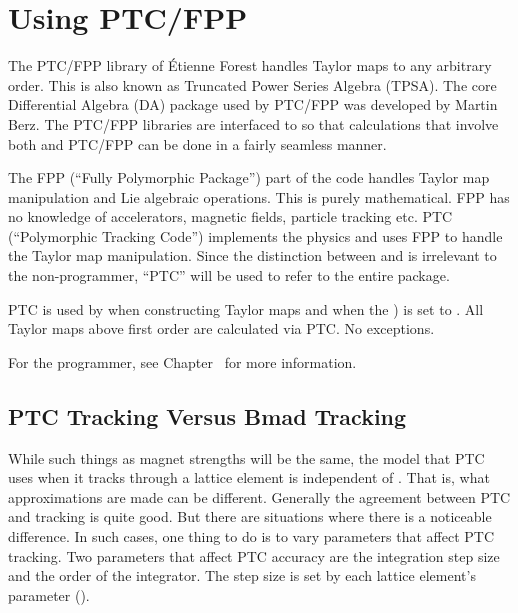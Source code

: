 \chapter{Using PTC/FPP}
\label{c:ptc.use}


The PTC/FPP library of \'Etienne Forest handles Taylor maps to any arbitrary order. This is also
known as Truncated Power Series Algebra (TPSA). The core Differential Algebra (DA) package used by
PTC/FPP was developed by Martin Berz\cite{b:berz}. The PTC/FPP libraries are interfaced to \bmad so
that calculations that involve both \bmad and PTC/FPP can be done in a fairly seamless manner.

The FPP (``Fully Polymorphic Package'') part of the code handles Taylor map manipulation
and Lie algebraic operations. This is purely mathematical. FPP has no knowledge of accelerators,
magnetic fields, particle tracking etc. PTC (``Polymorphic Tracking Code'') implements the physics
and uses FPP to handle the Taylor map manipulation. Since the distinction between  and
 is irrelevant to the non-programmer, ``PTC'' will be used to refer to the entire package.

PTC is used by \bmad when constructing Taylor maps and when the 
) is set to . All Taylor maps above first order are calculated
via PTC. No exceptions.

For the programmer, see Chapter~ for more information.

\section{PTC Tracking Versus Bmad Tracking}
\label{s:ptc.bmad.track}

While such things as magnet strengths will be the same, the model that PTC uses when it tracks
through a lattice element is independent of \bmad. That is, what approximations are made can be
different. Generally the agreement between PTC and \bmad tracking is quite good. But there are
situations where there is a noticeable difference. In such cases, one thing to do is to vary
parameters that affect PTC tracking. Two parameters that affect PTC accuracy are the integration
step size and the order of the integrator. The step size is set by each lattice element's 
parameter (). 

